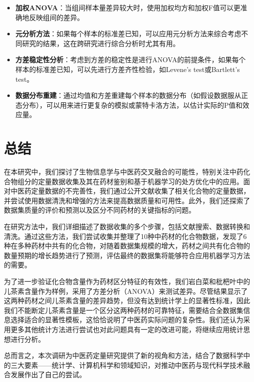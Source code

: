 \begin{itemize}
\item   \textbf{加权ANOVA}：当组间样本量差异较大时，使用加权均方和加权F值可以更准确地反映组间的差异。
\item   \textbf{元分析方法}：如果每个样本的标准差已知，可以应用元分析方法来综合考虑不同研究的结果，这在跨研究进行综合分析时尤其有用。
\item   \textbf{方差稳定性分析}：考虑到方差的稳定性是进行ANOVA的前提条件，如果每个样本的标准差已知，可以先进行方差齐性检验，如Levene's test或Bartlett's test。
\item   \textbf{数据分布重建}：通过均值和方差重建每个样本的数据分布（如假设数据服从正态分布），可以用来进行更复杂的模拟或蒙特卡洛方法，以估计实际的P值和效应量。
\end{itemize}

\section{总结}
在本研究中，我们探讨了生物信息学与中医药交叉融合的可能性，特别关注中药化合物组分的定量数据收集及其在药材鉴别和基于机器学习的处方优化中的应用。面对中医药定量数据的不完善性，我们通过公开文献收集了相关化合物的定量数据，并尝试使用数据清洗和增强的方法来提高数据质量和可用性。此外，我们还探索了数据集质量的评价和预测以及区分不同药材的关键指标的问题。

在研究方法中，我们详细描述了数据收集的多个步骤，包括文献搜索、数据转换和清洗。通过这些方法，我们尝试收集并整理了10种中药材的化合物数据，发现了6种在多种药材中共有的化合物，对随着数据集规模的增大，药材之间共有化合物的数量预期的增长趋势进行了预测，评估最终的数据集将能够符合应用机器学习方法的需要。

为了进一步验证化合物含量作为药材区分特征的有效性，我们岩白菜和枇杷叶中的儿茶素含量作为样例，采用了方差分析（ANOVA）来测试差异。尽管结果显示了这两种药材之间儿茶素含量的差异趋势，但没有达到统计学上的显著性标准，因此我们不能断定儿茶素含量是一个区分这两种药材的可靠特征，需要结合全数据集信息选择适合的显著性模板，这恰恰说明了中医药实际问题的复杂性。我们还认为采用更多其他统计方法进行尝试也对此问题具有一定的改进可能，将继续应用统计思想进行分析。

总而言之，本次调研为中医药定量研究提供了新的视角和方法，结合了数据科学中的三大要素——统计学、计算机科学和领域知识，对推动中医药与现代科学技术融合发展作出了自己的尝试。\cite{cite1}